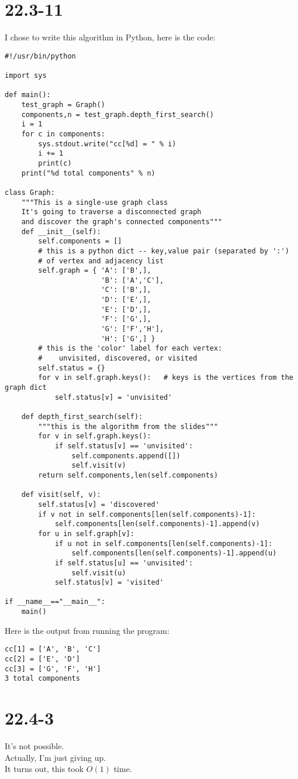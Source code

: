 \documentclass{article}
\begin{document}
\section*{22.3-11}
I chose to write this algorithm in Python, here is the code:
\begin{verbatim}
#!/usr/bin/python

import sys

def main():
    test_graph = Graph()
    components,n = test_graph.depth_first_search()
    i = 1
    for c in components:
        sys.stdout.write("cc[%d] = " % i)
        i += 1
        print(c)
    print("%d total components" % n)

class Graph:
    """This is a single-use graph class
    It's going to traverse a disconnected graph
    and discover the graph's connected components"""
    def __init__(self):
        self.components = []
        # this is a python dict -- key,value pair (separated by ':') 
        # of vertex and adjacency list
        self.graph = { 'A': ['B',],
                       'B': ['A','C'],
                       'C': ['B',],
                       'D': ['E',],
                       'E': ['D',],
                       'F': ['G',],
                       'G': ['F','H'],
                       'H': ['G',] }
        # this is the 'color' label for each vertex: 
        #    unvisited, discovered, or visited
        self.status = {}
        for v in self.graph.keys():   # keys is the vertices from the graph dict
            self.status[v] = 'unvisited'
        
    def depth_first_search(self):
        """this is the algorithm from the slides"""
        for v in self.graph.keys():
            if self.status[v] == 'unvisited':
                self.components.append([])
                self.visit(v)
        return self.components,len(self.components)

    def visit(self, v):
        self.status[v] = 'discovered'
        if v not in self.components[len(self.components)-1]:
            self.components[len(self.components)-1].append(v)
        for u in self.graph[v]:
            if u not in self.components[len(self.components)-1]:
                self.components[len(self.components)-1].append(u)
            if self.status[u] == 'unvisited':
                self.visit(u)
            self.status[v] = 'visited'

if __name__=="__main__":
    main()
\end{verbatim}
Here is the output from running the program:
\begin{verbatim}
cc[1] = ['A', 'B', 'C']
cc[2] = ['E', 'D']
cc[3] = ['G', 'F', 'H']
3 total components
\end{verbatim}

\section*{22.4-3}
It's not possible.\\
Actually, I'm just giving up.\\
It turns out, this took $O(1)$ time.\\
\end{document}
